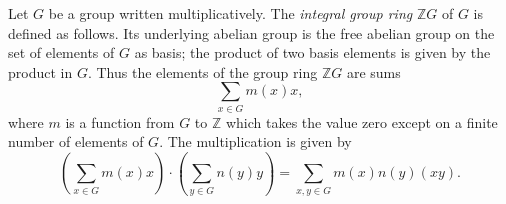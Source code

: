 Let $G$ be a group written multiplicatively. The \emph{integral group ring} $\mathbb{Z}G$ of $G$ is defined as follows. Its underlying abelian group is the free abelian group on the set of elements of $G$ as basis; the product of two basis elements is given by the product in $G$. Thus the elements of the group ring $\mathbb{Z}G$ are sums
$$\sum_{x \in G} m(x) x,$$
where $m$ is a function from $G$ to $\mathbb{Z}$ which takes the value zero except on a finite number of elements of $G$. The multiplication is given by
$$\left( \sum_{x \in G} m(x) x \right) \cdot \left( \sum_{y \in G} n(y) y \right) = \sum_{x,y \in G} m(x)n(y) (xy).$$
